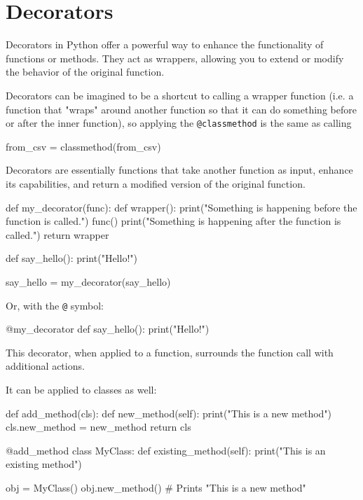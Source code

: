 \section{Decorators}

Decorators in Python offer a powerful way to enhance the functionality of functions or methods.
They act as wrappers, allowing you to extend or modify the behavior of the original function.

Decorators can be imagined to be a shortcut to calling a wrapper function (i.e. a function that
"wraps" around another function so that it can do something before or after the inner function), so
applying the \texttt{@classmethod} is the same as calling 
\begin{codeblock}[language=Python]
    from_csv = classmethod(from_csv)
\end{codeblock}

\begin{definitionblock}
    Decorators are essentially functions that take another function as input, enhance its capabilities,
    and return a modified version of the original function.
\end{definitionblock}

\begin{codeblock}[language=Python]
def my_decorator(func):
    def wrapper():
        print("Something is happening before the function is called.")
        func()
        print("Something is happening after the function is called.")
    return wrapper

def say_hello():
    print("Hello!")

say_hello = my_decorator(say_hello)
\end{codeblock}

Or, with the \texttt{@} symbol:

\begin{codeblock}[language=Python]
@my_decorator
def say_hello():
    print("Hello!")
\end{codeblock}

This decorator, when applied to a function, surrounds the function call with additional actions.

It can be applied to classes as well:

\begin{codeblock}[language=Python]
def add_method(cls):
    def new_method(self):
        print("This is a new method")
    cls.new_method = new_method
    return cls

@add_method
class MyClass:
    def existing_method(self):
        print("This is an existing method")
    
obj = MyClass()
obj.new_method() # Prints "This is a new method"
\end{codeblock}

